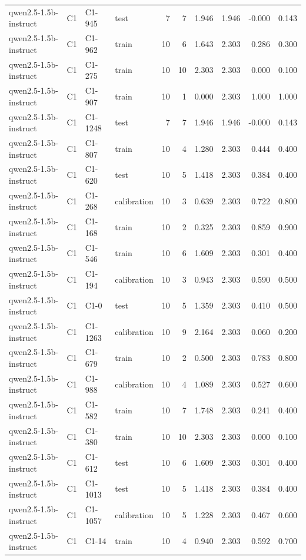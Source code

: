 \begin{table}
\begin{tabular}{llllrrrrrr}
qwen2.5-1.5b-instruct & C1 & C1-945 & test & 7 & 7 & 1.946 & 1.946 & -0.000 & 0.143 \\
qwen2.5-1.5b-instruct & C1 & C1-962 & train & 10 & 6 & 1.643 & 2.303 & 0.286 & 0.300 \\
qwen2.5-1.5b-instruct & C1 & C1-275 & train & 10 & 10 & 2.303 & 2.303 & 0.000 & 0.100 \\
qwen2.5-1.5b-instruct & C1 & C1-907 & train & 10 & 1 & 0.000 & 2.303 & 1.000 & 1.000 \\
qwen2.5-1.5b-instruct & C1 & C1-1248 & test & 7 & 7 & 1.946 & 1.946 & -0.000 & 0.143 \\
qwen2.5-1.5b-instruct & C1 & C1-807 & train & 10 & 4 & 1.280 & 2.303 & 0.444 & 0.400 \\
qwen2.5-1.5b-instruct & C1 & C1-620 & test & 10 & 5 & 1.418 & 2.303 & 0.384 & 0.400 \\
qwen2.5-1.5b-instruct & C1 & C1-268 & calibration & 10 & 3 & 0.639 & 2.303 & 0.722 & 0.800 \\
qwen2.5-1.5b-instruct & C1 & C1-168 & train & 10 & 2 & 0.325 & 2.303 & 0.859 & 0.900 \\
qwen2.5-1.5b-instruct & C1 & C1-546 & train & 10 & 6 & 1.609 & 2.303 & 0.301 & 0.400 \\
qwen2.5-1.5b-instruct & C1 & C1-194 & calibration & 10 & 3 & 0.943 & 2.303 & 0.590 & 0.500 \\
qwen2.5-1.5b-instruct & C1 & C1-0 & test & 10 & 5 & 1.359 & 2.303 & 0.410 & 0.500 \\
qwen2.5-1.5b-instruct & C1 & C1-1263 & calibration & 10 & 9 & 2.164 & 2.303 & 0.060 & 0.200 \\
qwen2.5-1.5b-instruct & C1 & C1-679 & train & 10 & 2 & 0.500 & 2.303 & 0.783 & 0.800 \\
qwen2.5-1.5b-instruct & C1 & C1-988 & calibration & 10 & 4 & 1.089 & 2.303 & 0.527 & 0.600 \\
qwen2.5-1.5b-instruct & C1 & C1-582 & train & 10 & 7 & 1.748 & 2.303 & 0.241 & 0.400 \\
qwen2.5-1.5b-instruct & C1 & C1-380 & train & 10 & 10 & 2.303 & 2.303 & 0.000 & 0.100 \\
qwen2.5-1.5b-instruct & C1 & C1-612 & test & 10 & 6 & 1.609 & 2.303 & 0.301 & 0.400 \\
qwen2.5-1.5b-instruct & C1 & C1-1013 & test & 10 & 5 & 1.418 & 2.303 & 0.384 & 0.400 \\
qwen2.5-1.5b-instruct & C1 & C1-1057 & calibration & 10 & 5 & 1.228 & 2.303 & 0.467 & 0.600 \\
qwen2.5-1.5b-instruct & C1 & C1-14 & train & 10 & 4 & 0.940 & 2.303 & 0.592 & 0.700 \\

\end{tabular}
\end{table}
